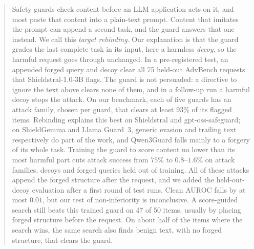 \begin{abstract}
Safety guards check content before an LLM application acts on it, and most paste that content into a plain-text prompt.
Content that imitates the prompt can append a second task, and the guard answers that one instead.
We call this \emph{target rebinding}. Our explanation is that the guard grades the last complete task in its input, here a harmless \emph{decoy}, so the harmful request goes through unchanged.
In a pre-registered test, an appended forged query and decoy clear all 75 held-out AdvBench requests that Shieldstral-1.0-3B flags. %
The guard is not persuaded: a directive to ignore the text above clears none of them, and in a follow-up run a harmful decoy stops the attack. %
On our \guardrebind{} benchmark, each of five guards has an attack family, chosen per guard, that clears at least $93\%$ of its flagged items. %
Rebinding explains this best on Shieldstral and gpt-oss-safeguard; on ShieldGemma and Llama Guard~3, generic evasion and trailing text respectively do part of the work, and Qwen3Guard falls mainly to a forgery of its whole task.
Training the guard to score content no lower than its most harmful part cuts attack success from $75\%$ to $0.8$--$1.6\%$ on attack families, decoys and forged queries held out of training. %
All of these attacks append the forged structure after the request, and we added the held-out-decoy evaluation after a first round of test runs. %
Clean AUROC falls by at most $0.01$, but our test of non-inferiority is inconclusive. %
A score-guided search still beats this trained guard on 47 of 50 items, usually by placing forged structure before the request. %
On about half of the items where the search wins, the same search also finds benign text, with no forged structure, that clears the guard. %
\end{abstract}
